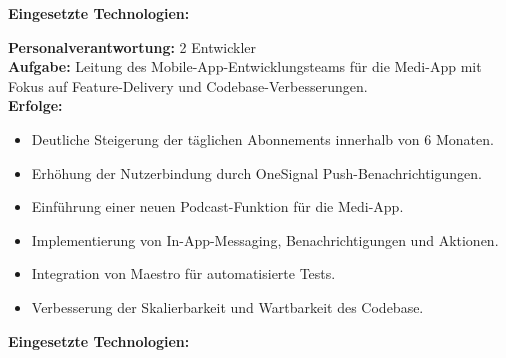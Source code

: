 \documentclass[10pt,a4paper,normalphoto]{altacv}
\begin{document}
\begin{fullwidth}
\textbf{Eingesetzte Technologien:}\\[0.4em]

\vspace{2em}

\textbf{Personalverantwortung:} 2 Entwickler \\
\textbf{Aufgabe:} Leitung des Mobile-App-Entwicklungsteams für die Medi-App mit Fokus auf Feature-Delivery und Codebase-Verbesserungen.\\
\textbf{Erfolge:}
\begin{itemize}
    \item Deutliche Steigerung der täglichen Abonnements innerhalb von 6 Monaten.
    \item Erhöhung der Nutzerbindung durch OneSignal Push-Benachrichtigungen.
    \item Einführung einer neuen Podcast-Funktion für die Medi-App.
    \item Implementierung von In-App-Messaging, Benachrichtigungen und Aktionen.
    \item Integration von Maestro für automatisierte Tests.
    \item Verbesserung der Skalierbarkeit und Wartbarkeit des Codebase.
\end{itemize}

\textbf{Eingesetzte Technologien:}\\[0.4em]


\end{fullwidth}
\end{document}
